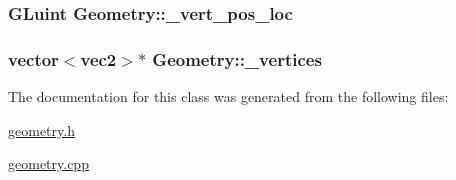 \hypertarget{class_geometry_a547d84fcd9258557891da46d19985544}{
\subsubsection[{\+\_\+vert\+\_\+pos\+\_\+loc}]{\setlength{\rightskip}{0pt plus 5cm}G\+Luint Geometry\+::\+\_\+vert\+\_\+pos\+\_\+loc}}\label{class_geometry_a547d84fcd9258557891da46d19985544}
\hypertarget{class_geometry_a6bba14459d18ceb7000fe8e36c96b509}{
\subsubsection[{\+\_\+vertices}]{\setlength{\rightskip}{0pt plus 5cm}vector$<$vec2$>$$\ast$ Geometry\+::\+\_\+vertices}}\label{class_geometry_a6bba14459d18ceb7000fe8e36c96b509}


The documentation for this class was generated from the following files\+:\begin{DoxyCompactItemize}
\item 
\hyperlink{geometry_8h}{geometry.\+h}\item 
\hyperlink{geometry_8cpp}{geometry.\+cpp}\end{DoxyCompactItemize}
